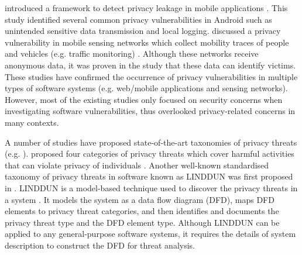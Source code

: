 \citeauthor{Yang2013} introduced a framework to detect privacy leakage in mobile applications \cite{Yang2013}. This study identified several common privacy vulnerabilities in Android such as unintended sensitive data transmission and local logging. \citeauthor{Ma2013} discussed a privacy vulnerability in mobile sensing networks which collect mobility traces of people and vehicles (e.g. traffic monitoring) \cite{Ma2013}. Although these networks receive anonymous data, it was proven in the study that these data can identify victims. These studies have confirmed the occurrence of privacy vulnerabilities in multiple types of software systems (e.g. web/mobile applications and sensing networks). However, most of the existing studies only focused on security concerns when investigating software vulnerabilities, thus overlooked privacy-related concerns in many contexts.

A number of studies have proposed state-of-the-art taxonomies of privacy threats (e.g. \cite{Solove2006a, Deng2011, Wuyts2014a}). \citeauthor{Solove2006a} proposed four categories of privacy threats which cover harmful activities that can violate privacy of individuals \cite{Solove2006a}. Another well-known standardised taxonomy of privacy threats in software known as LINDDUN was first proposed in \cite{Deng2011}. LINDDUN is a model-based technique used to discover the privacy threats in a system \cite{Wuyts2014a}. It models the system as a data flow diagram (DFD), maps DFD elements to privacy threat categories, and then identifies and documents the privacy threat type and the DFD element type. Although LINDDUN can be applied to any general-purpose software systems, it requires the details of system description to construct the DFD for threat analysis.

